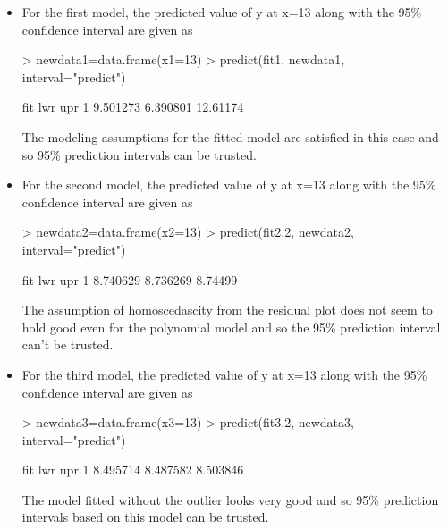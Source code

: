 \documentclass[12pt]{article}
\begin{document}
\begin{itemize}
\item For the first model, the predicted value of y at x=13 along with the 95\% confidence interval are given as
\begin{Schunk}
\begin{Sinput}
> newdata1=data.frame(x1=13)
> predict(fit1, newdata1, interval="predict")
\end{Sinput}
\begin{Soutput}
       fit      lwr      upr
1 9.501273 6.390801 12.61174
\end{Soutput}
\end{Schunk}

The modeling assumptions for the fitted model are satisfied in this case and so 95\% prediction intervals can be trusted.

\item For the second model, the predicted value of y at x=13 along with the 95\% confidence interval are given as
\begin{Schunk}
\begin{Sinput}
> newdata2=data.frame(x2=13)
> predict(fit2.2, newdata2, interval="predict")
\end{Sinput}
\begin{Soutput}
       fit      lwr     upr
1 8.740629 8.736269 8.74499
\end{Soutput}
\end{Schunk}

The assumption of homoscedascity from the residual plot does not seem to hold good even for the polynomial model and so the 95\% prediction interval can't be trusted.

\item For the third model, the predicted value of y at x=13 along with the 95\% confidence interval are given as
\begin{Schunk}
\begin{Sinput}
> newdata3=data.frame(x3=13)
> predict(fit3.2, newdata3, interval="predict")
\end{Sinput}
\begin{Soutput}
       fit      lwr      upr
1 8.495714 8.487582 8.503846
\end{Soutput}
\end{Schunk}

The model fitted without the outlier looks very good and so 95\% prediction intervals based on this model can be trusted.


\end{itemize}
\end{document}
